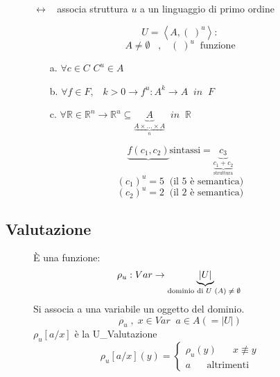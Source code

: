 \documentclass{article}
\theoremstyle{break}
\theoremstyle{break}
\theoremstyle{break}
\theoremstyle{break}
\begin{document}
\begin{figure}[H]
  \begin{definition}[L\_Struttura]
    \(
    \leftrightarrow\;\;     \) associa struttura \( u \) a un linguaggio di primo ordine

    \[
      U = \left<A, (\;)^u\right>:
    \] 
    \[
      A \neq \emptyset \;\;\;,\;\;\; (\;)^u \;\;\text{funzione}
    \]
    \begin{itemize}
      \item[a.] \( \forall c \in C \) \( C^u \in A \) 
      \item[b.] \( \forall f \in F, \;\;\; k>0 \to f^u : A^k \to A \;\; in \;\;F \) 
      \item [c.] \( \forall \mathbb{R} \in \mathbb{R}^n \to \mathbb{R}^u \subseteq \underbrace{A}_{\underbrace{A \times \ldots \times A}_{n}} \;\; in \;\;\mathbb{R} \) 
    \end{itemize}
  \end{definition}
  \[
    \underbrace{f(c_1,c_2)}{\text{sintassi}} = \underbrace{c_3}_{\underbrace{c_1+c_2}_{\text{struttura}}}
  \] 
  \[
    (c_1)^u = 5 \;\;\text{(il 5 è semantica)}
  \] 
  \[
    (c_2)^u = 2 \;\;\text{(il 2 è semantica)}
  \] 
\end{figure}

\subsection{Valutazione}

\begin{figure}[H]
  \begin{definition}
    È una funzione:
    \[
      \rho_u: Var \to \underbrace{|U|}_{\text{dominio di \( U \) \( (A) \neq \emptyset \)  }}
    \] 
    Si associa a una variabile un oggetto del dominio.
    \[
      \rho_u\;,\; x \in Var \;\; a \in A (=|U|)
    \] 
    \(
    \rho_u[a/x]
    \) è la U\_Valutazione
    \[
      \rho_u[a/x](y)= \begin{cases}
        \rho_u(y)\;\;\;\;\;\; x \not\equiv y\\
        a \;\;\;\;\;\; \text{altrimenti}
      \end{cases}    \] 
    \end{definition}
  \end{figure}
\end{document}
